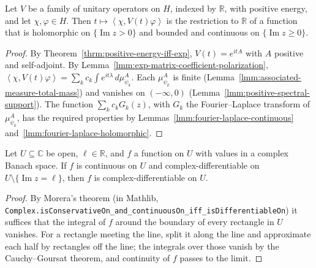 \begin{lemma}
    \label{lmm:positive-energy-holomorphic}
    \leanok
    Let $V$ be a family of unitary operators on $H$, indexed by $\mathbb{R}$, with positive energy, and let $\chi, \varphi \in H$. Then $t \mapsto \left< \chi, V(t)\varphi \right>$ is the restriction to $\mathbb{R}$ of a function that is holomorphic on $\{\operatorname{Im} z > 0\}$ and bounded and continuous on $\{\operatorname{Im} z \ge 0\}$.
\end{lemma}
\begin{proof}
    \leanok
    By Theorem~\ref{thrm:positive-energy-iff-exp}, $V(t) = e^{itA}$ with $A$ positive and self-adjoint. By Lemma~\ref{lmm:exp-matrix-coefficient-polarization}, $\left< \chi, V(t)\varphi \right> = \sum_k c_k \int e^{it\lambda} \, d\mu^A_{\psi_k}$. Each $\mu^A_{\psi_k}$ is finite (Lemma~\ref{lmm:associated-measure-total-mass}) and vanishes on $(-\infty, 0)$ (Lemma~\ref{lmm:positive-spectral-support}). The function $\sum_k c_k G_k(z)$, with $G_k$ the Fourier--Laplace transform of $\mu^A_{\psi_k}$, has the required properties by Lemmas~\ref{lmm:fourier-laplace-continuous} and~\ref{lmm:fourier-laplace-holomorphic}.
\end{proof}

\begin{lemma}
    \label{lmm:horizontal-line-removable}
    \leanok
    Let $U \subseteq \mathbb{C}$ be open, $\ell \in \mathbb{R}$, and $f$ a function on $U$ with values in a complex Banach space. If $f$ is continuous on $U$ and complex-differentiable on $U \setminus \{\operatorname{Im} z = \ell\}$, then $f$ is complex-differentiable on $U$.
\end{lemma}
\begin{proof}
    \leanok
    By Morera's theorem (in Mathlib, \texttt{Complex.isConservativeOn\_and\_continuousOn\_iff\_isDifferentiableOn}) it suffices that the integral of $f$ around the boundary of every rectangle in $U$ vanishes. For a rectangle meeting the line, split it along the line and approximate each half by rectangles off the line; the integrals over those vanish by the Cauchy--Goursat theorem, and continuity of $f$ passes to the limit.
\end{proof}


